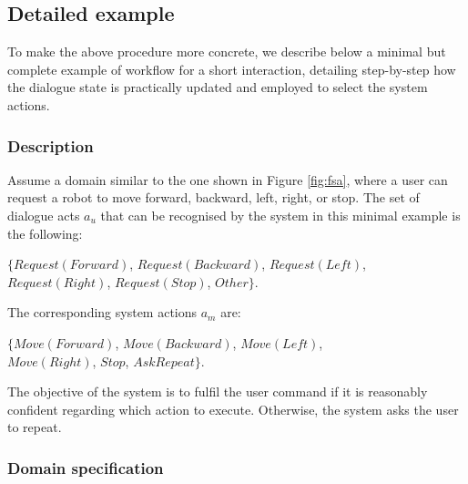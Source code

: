 \subsection{Detailed example}
\label{sec:detailedexample}

To make the above procedure more concrete, we describe below a minimal but complete example of workflow for a short interaction, detailing step-by-step how the dialogue state is practically updated and employed to select the system actions. 

\subsubsection*{Description}

Assume a domain similar to the one shown in Figure \ref{fig:fsa}, where a user can request a robot to move forward, backward, left, right, or stop.  The set of dialogue acts $a_u$ that can be recognised by the system in this minimal example is the following: 
\begin{center}
$\{\mathit{Request(Forward)}$, $\mathit{Request(Backward)}$, $\mathit{Request(Left)}$, \\ $\mathit{Request(Right)}$, $\mathit{Request(Stop)}$, $\mathit{Other}\}$. \\
\end{center}
The corresponding system actions $a_m$ are: 
\begin{center}
$\{\mathit{Move(Forward)}$, $\mathit{Move(Backward)}$, $\mathit{Move(Left)}$, \\ $\mathit{Move(Right)}$, $\mathit{Stop}$, $\mathit{AskRepeat}\}$. 
\end{center}
The objective of the system is to fulfil the user command if it is reasonably confident regarding which action to execute.  Otherwise, the system asks the user to repeat. 

\subsubsection*{Domain specification}

